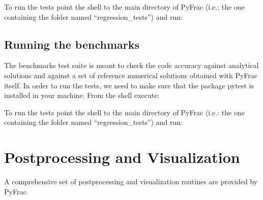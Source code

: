 \documentclass[letterpaper,10pt,english]{sphinxmanual}
\begin{document}
\begin{sphinxVerbatim}[commandchars=\\\{\}]
\end{sphinxVerbatim}

\sphinxAtStartPar
To run the tests point the shell to the main directory of PyFrac (i.e.: the one containing the folder named “regression\_tests”) and run:

\begin{sphinxVerbatim}[commandchars=\\\{\}]
\end{sphinxVerbatim}


\subsection{Running the benchmarks}
\label{\detokenize{RunningASimulation:running-the-benchmarks}}
\sphinxAtStartPar
The benchmarks test suite is meant to check the code accuracy against analytical solutions and against a set of reference numerical solutions obtained with PyFrac itself.
In order to run the tests, we need to make sure that the package pytest is installed in your machine. From the shell execute:

\begin{sphinxVerbatim}[commandchars=\\\{\}]
\end{sphinxVerbatim}

\sphinxAtStartPar
To run the tests point the shell to the main directory of PyFrac (i.e.: the one containing the folder named “regression\_tests”) and run:

\begin{sphinxVerbatim}[commandchars=\\\{\}]
\end{sphinxVerbatim}

\sphinxstepscope


\section{Post\sphinxhyphen{}processing and Visualization}
\label{\detokenize{Visualization:post-processing-and-visualization}}\label{\detokenize{Visualization:postproc-visul}}\label{\detokenize{Visualization::doc}}
\sphinxAtStartPar
A comprehensive set of post\sphinxhyphen{}processing and visualization routines are provided by PyFrac.
\end{document}

